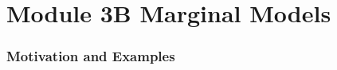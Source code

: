 \documentclass[
  letterpaper,
  DIV=11,
  numbers=noendperiod]{scrreprt}
\begin{document}

\hypertarget{module-3b-marginal-models}{%
\chapter*{Module 3B Marginal Models}\label{module-3b-marginal-models}}


\hypertarget{motivation-and-examples-6}{%
\subsection*{Motivation and Examples}\label{motivation-and-examples-6}}
\end{document}
